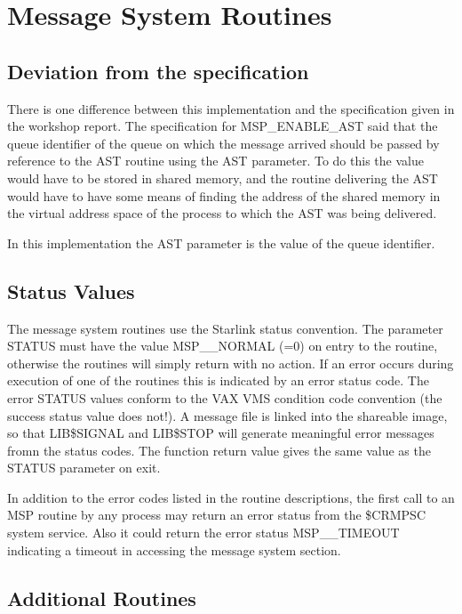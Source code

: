 \newpage

\section{Message System Routines}

\subsection{Deviation from the specification}

There is one difference between this implementation and the
specification given in the workshop report. The specification
for MSP\_ENABLE\_AST said that the queue identifier of the queue
on which the message arrived should be passed by reference to the
AST routine using the AST parameter. To do this the value would have
to be stored in shared memory, and the routine delivering the AST would
have to have some means of finding the address of the shared memory in the
virtual address space of the process to which the AST was being delivered.

In this implementation the AST parameter is the value of the
queue identifier.

\subsection{Status Values}

The message system routines use the Starlink status convention.
The parameter STATUS must have the value MSP\_\_NORMAL (=0) on entry to
the routine, otherwise the routines will simply return with no action.
If an error occurs during execution of one of the routines this is indicated
by an error status code. The error STATUS values conform to the VAX VMS
condition code convention (the success status value does not!). A message
file is linked into the shareable image, so that LIB\$SIGNAL and LIB\$STOP
will generate meaningful error messages fromn the status codes. The function
return value gives the same value as the STATUS parameter on exit.   
              
In addition to the error codes listed in the routine descriptions, the
first call to an MSP routine by any process may return an error status from
the \$CRMPSC system service. Also it could return the error status
MSP\_\_TIMEOUT indicating a timeout in accessing the message system section.

\subsection{Additional Routines}

